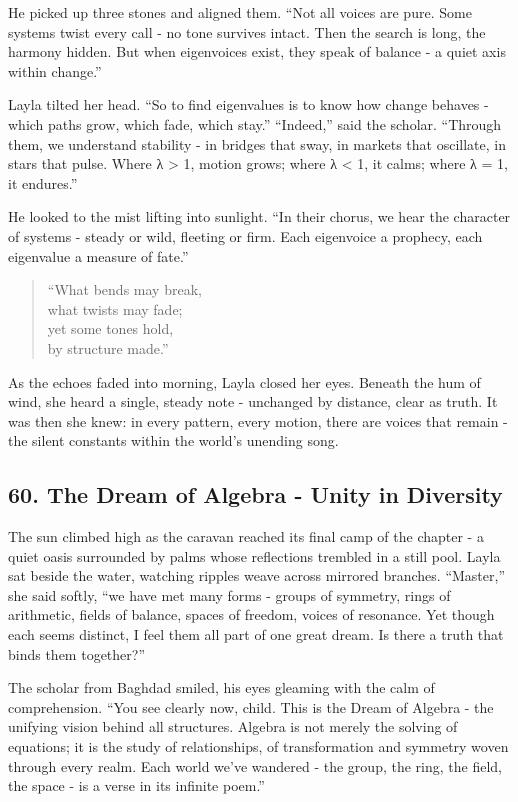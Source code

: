 \documentclass[
  letterpaper,
  DIV=11,
  numbers=noendperiod]{scrreprt}
\begin{document}
He picked up three stones and aligned them. ``Not all voices are pure.
Some systems twist every call - no tone survives intact. Then the search
is long, the harmony hidden. But when eigenvoices exist, they speak of
balance - a quiet axis within change.''

Layla tilted her head. ``So to find eigenvalues is to know how change
behaves - which paths grow, which fade, which stay.'' ``Indeed,'' said
the scholar. ``Through them, we understand stability - in bridges that
sway, in markets that oscillate, in stars that pulse. Where λ
\textgreater{} 1, motion grows; where λ \textless{} 1, it calms; where λ
= 1, it endures.''

He looked to the mist lifting into sunlight. ``In their chorus, we hear
the character of systems - steady or wild, fleeting or firm. Each
eigenvoice a prophecy, each eigenvalue a measure of fate.''

\begin{quote}
``What bends may break,\\
what twists may fade;\\
yet some tones hold,\\
by structure made.''
\end{quote}

As the echoes faded into morning, Layla closed her eyes. Beneath the hum
of wind, she heard a single, steady note - unchanged by distance, clear
as truth. It was then she knew: in every pattern, every motion, there
are voices that remain - the silent constants within the world's
unending song.

\subsection{60. The Dream of Algebra - Unity in
Diversity}\label{the-dream-of-algebra---unity-in-diversity}

The sun climbed high as the caravan reached its final camp of the
chapter - a quiet oasis surrounded by palms whose reflections trembled
in a still pool. Layla sat beside the water, watching ripples weave
across mirrored branches. ``Master,'' she said softly, ``we have met
many forms - groups of symmetry, rings of arithmetic, fields of balance,
spaces of freedom, voices of resonance. Yet though each seems distinct,
I feel them all part of one great dream. Is there a truth that binds
them together?''

The scholar from Baghdad smiled, his eyes gleaming with the calm of
comprehension. ``You see clearly now, child. This is the Dream of
Algebra - the unifying vision behind all structures. Algebra is not
merely the solving of equations; it is the study of relationships, of
transformation and symmetry woven through every realm. Each world we've
wandered - the group, the ring, the field, the space - is a verse in its
infinite poem.''
\end{document}
